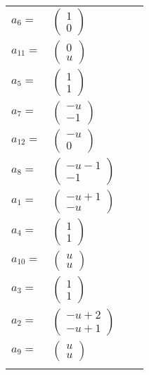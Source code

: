\documentclass[1p]{elsarticle_modified}
\theoremstyle{definition}
\begin{document}
\begin{tabular}{m{7pt} m{180pt} m{7pt} m{180pt} }
\flushright $a_{6}=$&$\begin{pmatrix}1\\0\end{pmatrix}$ \\
\flushright $a_{11}=$&$\begin{pmatrix}0\\u\end{pmatrix}$ \\
\flushright $a_{5}=$&$\begin{pmatrix}1\\1\end{pmatrix}$ \\
\flushright $a_{7}=$&$\begin{pmatrix}- u\\-1\end{pmatrix}$ \\
\flushright $a_{12}=$&$\begin{pmatrix}- u\\0\end{pmatrix}$ \\
\flushright $a_{8}=$&$\begin{pmatrix}- u-1\\-1\end{pmatrix}$ \\
\flushright $a_{1}=$&$\begin{pmatrix}- u+1\\- u\end{pmatrix}$ \\
\flushright $a_{4}=$&$\begin{pmatrix}1\\1\end{pmatrix}$ \\
\flushright $a_{10}=$&$\begin{pmatrix}u\\u\end{pmatrix}$ \\
\flushright $a_{3}=$&$\begin{pmatrix}1\\1\end{pmatrix}$ \\
\flushright $a_{2}=$&$\begin{pmatrix}- u+2\\- u+1\end{pmatrix}$ \\
\flushright $a_{9}=$&$\begin{pmatrix}u\\u\end{pmatrix}$\\&\end{tabular}
\end{document}
